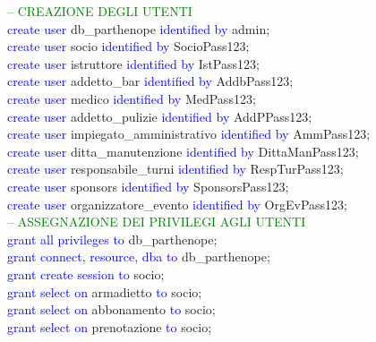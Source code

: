 \documentclass{article}
\begin{document}
    \begin{flushleft}
        \textcolor{green}{-- CREAZIONE DEGLI UTENTI} \\
        \textcolor{blue}{create user} db\_parthenope \textcolor{blue}{identified by} admin; \\
        \textcolor{blue}{create user} socio \textcolor{blue}{identified by} SocioPass123; \\
        \textcolor{blue}{create user} istruttore \textcolor{blue}{identified by} IstPass123; \\
        \textcolor{blue}{create user} addetto\_bar \textcolor{blue}{identified by} AddbPass123; \\
        \textcolor{blue}{create user} medico \textcolor{blue}{identified by} MedPass123; \\
        \textcolor{blue}{create user} addetto\_pulizie \textcolor{blue}{identified by} AddPPass123; \\
        \textcolor{blue}{create user} impiegato\_amministrativo \textcolor{blue}{identified by} AmmPass123; \\
        \textcolor{blue}{create user} ditta\_manutenzione \textcolor{blue}{identified by} DittaManPass123; \\
        \textcolor{blue}{create user} responsabile\_turni \textcolor{blue}{identified by} RespTurPass123; \\
        \textcolor{blue}{create user} sponsors \textcolor{blue}{identified by} SponsorsPass123; \\
        \textcolor{blue}{create user} organizzatore\_evento \textcolor{blue}{identified by} OrgEvPass123; \\
        \vspace{2mm}
        \textcolor{green}{-- ASSEGNAZIONE DEI PRIVILEGI AGLI UTENTI} \\
        \textcolor{blue}{grant all privileges to} db\_parthenope; \\
        \textcolor{blue}{grant connect, resource, dba to} db\_parthenope; \\
        \vspace{2mm}
        \textcolor{blue}{grant create session to} socio; \\
        \textcolor{blue}{grant select on} armadietto \textcolor{blue}{to} socio; \\
        \textcolor{blue}{grant select on} abbonamento \textcolor{blue}{to} socio; \\
        \textcolor{blue}{grant select on} prenotazione \textcolor{blue}{to} socio; \\

\end{flushleft}
\end{document}
